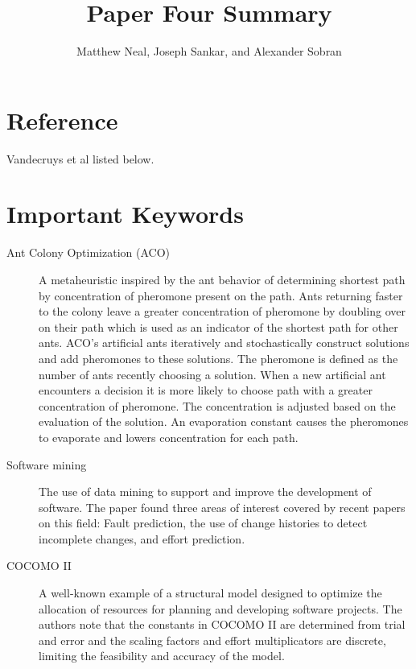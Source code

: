 \documentclass[english]{article}
\begin{document}
\title{Paper Four Summary}


\author{Matthew Neal, Joseph Sankar, and Alexander Sobran}

\maketitle

\section*{Reference}

Vandecruys et al \cite{Vandecruys08} listed below.


\section*{Important Keywords}
\begin{description}
\item [{Ant Colony Optimization (ACO)}] A metaheuristic inspired by the ant behavior of determining shortest path by concentration of pheromone present on the path. Ants returning faster to the colony leave a greater concentration of pheromone by doubling over on their path which is used as an indicator of the shortest path for other ants. ACO's artificial ants iteratively and stochastically construct solutions and add pheromones to these solutions. The pheromone is defined as the number of ants recently choosing a solution. When a new artificial ant encounters a decision it is more likely to choose path with a greater concentration of pheromone. The concentration is adjusted based on the evaluation of the solution. An evaporation constant causes the pheromones to evaporate and lowers concentration for each path.
\item [{Software mining}] The use of data mining to support and improve the development of software. The paper found three areas of interest covered by recent papers on this field: Fault prediction, the use of change histories to detect incomplete changes, and effort prediction.
\item[{COCOMO II}] A well-known example of a structural model designed to optimize the allocation of resources for planning and developing software projects. The authors note that the constants in COCOMO II are determined from trial and error and the scaling factors and effort multiplicators are discrete, limiting the feasibility and accuracy of the model.
\end{description}
\end{document}
